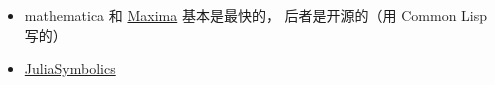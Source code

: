 
\begin{issues}
\issueDraft
\end{issues}

\begin{itemize}
\item mathematica 和 \href{https://maxima.sourceforge.io/}{Maxima} 基本是最快的， 后者是开源的（用 Common Lisp 写的）
\item \href{https://juliasymbolics.org/}{JuliaSymbolics}
\end{itemize}
